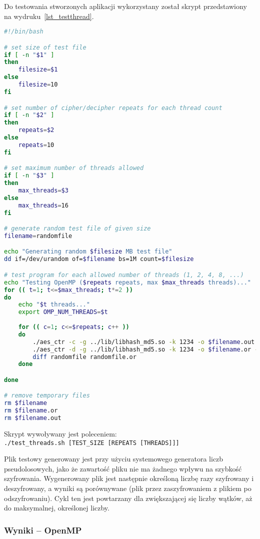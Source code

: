 \documentclass[a4paper,12pt]{article}
\begin{document}
Do testowania stworzonych aplikacji wykorzystany został skrypt przedstawiony na wydruku~\ref{lst_testthread}.
\begin{lstlisting}[label=lst_testthread,caption={Skrypt testowy (wersja OpenMP, 
wersja MPI różni się jedynie wywołaniem mpiexec zamiast prostego wywołania programu)},language=bash]
#!/bin/bash

# set size of test file
if [ -n "$1" ]
then
	filesize=$1
else
	filesize=10
fi

# set number of cipher/decipher repeats for each thread count
if [ -n "$2" ]
then
	repeats=$2
else
	repeats=10
fi

# set maximum number of threads allowed
if [ -n "$3" ]
then
	max_threads=$3
else
	max_threads=16
fi

# generate random test file of given size
filename=randomfile

echo "Generating random $filesize MB test file"
dd if=/dev/urandom of=$filename bs=1M count=$filesize

# test program for each allowed number of threads (1, 2, 4, 8, ...)
echo "Testing OpenMP ($repeats repeats, max $max_threads threads)..."
for (( t=1; t<=$max_threads; t*=2 ))
do
	echo "$t threads..."
	export OMP_NUM_THREADS=$t
	
	for (( c=1; c<=$repeats; c++ ))
	do
		./aes_ctr -c -g ../lib/libhash_md5.so -k 1234 -o $filename.out -s 128 $filename
		./aes_ctr -d -g ../lib/libhash_md5.so -k 1234 -o $filename.or -s 128 $filename.out
		diff randomfile randomfile.or
	done

done

# remove temporary files
rm $filename 
rm $filename.or
rm $filename.out
\end{lstlisting}

Skrypt wywoływany jest poleceniem:\\
\texttt{./test\_threads.sh [TEST\_SIZE [REPEATS [THREADS]]]}

Plik testowy generowany jest przy użyciu systemowego generatora liczb pseudolosowych, 
jako że zawartość pliku nie ma żadnego wpływu na szybkość szyfrowania. Wygenerowany
plik jest następnie określoną liczbę razy szyfrowany i deszyfrowany, a wyniki są 
porównywane (plik przez zaszyfrowaniem z plikiem po odszyfrowaniu). Cykl ten jest 
powtarzany dla zwiększającej się liczby wątków, aż do maksymalnej, określonej liczby.

\subsubsection{Wyniki -- OpenMP}
\end{document}
